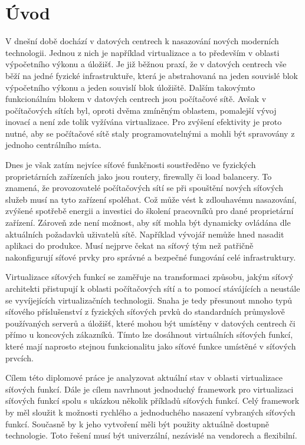 
\chapter{Úvod}

V dnešní době dochází v datových centrech k nasazování nových moderních technologii. Jednou z nich je například virtualizace a to především v oblasti výpočetního výkonu a úložišť. Je již běžnou praxí, že v datových centrech vše běží na jedné fyzické infrastruktuře, která je abstrahovaná na jeden souvislé blok výpočetního výkonu a jeden souvislí blok úložiště. Dalším takovýmto funkcionálním blokem v datových centrech jsou počítačové sítě. Avšak v počítačových sítích byl, oproti dvěma zmíněným oblastem, pomalejší vývoj inovací a není zde tolik vyžívána virtualizace. Pro zvýšení efektivity je proto nutné, aby se počítačové sítě staly programovatelnými a mohli být spravovány z jednoho centrálního místa. 

Dnes je však zatím nejvíce síťové funkčnosti soustředěno ve fyzických proprietárních zařízeních jako jsou routery, firewally či load balancery. To znamená, že provozovatelé počítačových sítí se při spouštění nových síťových služeb musí na tyto zařízení spoléhat. Což může vést k zdlouhavému nasazování, zvýšené spotřebě energii a investici do školení pracovníků pro dané proprietární zařízení. Zároveň zde není možnost, aby síť mohla být dynamicky ovládána dle aktuálních požadavků uživatelů sítě. Například vývojář nemůže hned nasadit aplikaci do produkce. Musí nejprve čekat na síťový tým než patřičně nakonfigurují síťové prvky pro správné a bezpečné fungování celé infrastruktury.

Virtualizace síťových funkcí se zaměřuje na transformaci způsobu, jakým síťový architekti přistupují k oblasti počítačových sítí a to pomocí stávájících a neustále se vyvíjejících virtualizačních technologii. Snaha je tedy přesunout mnoho typů síťového příslušenství z fyzických síťových prvků do standardních průmyslově používaných serverů a úložišť, které mohou být umístěny v datových centrech či přímo u koncových zákazníků. Tímto lze dosáhnout virtuálních síťových funkcí, které mají naprosto stejnou funkcionalitu jako síťové funkce umístěné v síťových prvcích.

Cílem této diplomové práce je analyzovat aktuální stav v oblasti virtualizace síťových funkcí. Dále je cílem navrhnout jednoduchý framework pro virtualizaci síťových funkcí spolu s ukázkou několik příkladů síťových funkcí. Celý framework by měl sloužit k možnosti rychlého a jednoduchého nasazení vybraných síťových funkcí. Současně by k jeho vytvoření měli být použity aktuálně dostupně technologie. Toto řešení musí být univerzální, nezávislé na vendorech a flexibilní.

